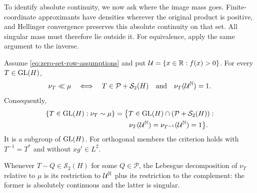 To identify absolute continuity, we now ask where the image mass goes.
Finite-coordinate approximants have densities wherever the original product
is positive, and Hellinger convergence preserves this absolute continuity
on that set. All singular mass must therefore lie outside it. For
equivalence, apply the same argument to the inverse.

\begin{theorem}
\label{thm:linear-equivalence-group}
Assume \eqref{eq:zero-set-row-assumptions} and put
$\mathcal U=\{x\in\mathbb R:f(x)>0\}$. For every $T\in\operatorname{GL}(H)$,
\begin{equation}
 \nu_T\ll\mu
 \quad\Longleftrightarrow\quad
 T\in\mathcal P+\mathcal S_2(H)
 \quad\text{and}\quad\nu_T(\mathcal U^{\mathbb N})=1.
 \label{eq:absolute-continuity-operator-criterion}
\end{equation}
Consequently,
\[
 \begin{aligned}
 \{T\in\operatorname{GL}(H):\nu_T\sim\mu\}
 &=\bigl\{T\in\operatorname{GL}(H)\cap(\mathcal P+\mathcal S_2(H)):\\
 &\qquad\nu_T(\mathcal U^{\mathbb N})
       =\nu_{T^{-1}}(\mathcal U^{\mathbb N})=1\bigr\}.
 \end{aligned}
\]
It is a subgroup of $\operatorname{GL}(H)$.  For orthogonal members the criterion holds with
$T^{-1}=T^*$ and without $xg'\in L^2$.

Whenever $T-Q\in\mathcal S_2(H)$ for some
$Q\in\mathcal P$, the Lebesgue decomposition of $\nu_T$ relative to
$\mu$ is its restriction to $\mathcal U^{\mathbb N}$ plus its restriction
to the complement: the former is absolutely continuous and the latter
is singular.
\end{theorem}
